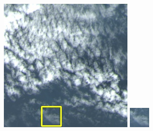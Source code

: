 \documentclass[UTF8]{ctexart}
\begin{document}
\begin{figure}[H]
{\begin{minipage}[b]{0.15\linewidth}
            \includegraphics[width=1\linewidth]{../log/spoon2/cut2/LC81620432014072LGN00_16237_color.jpg}\vspace{4pt}
            \includegraphics[width=1\linewidth]{../log/spoon2/cut2/tmp_cut_LC81620432014072LGN00_16237_color.jpg}\vspace{4pt}

\end{minipage}}
\end{figure}
\end{document}
